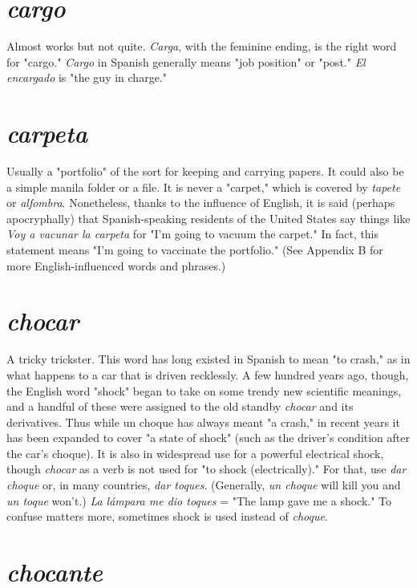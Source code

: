 \documentclass[14pt,a4paper,oneside]{memoir}
\begin{document}
\section{\emph{cargo}}

Almost works but not quite. \emph{Carga}, with the feminine ending, is the right word for "cargo." \emph{Cargo} in Spanish generally
means "job position" or "post." \emph{El encargado} is "the guy in charge."

\section{\emph{carpeta}}

Usually a "portfolio" of the sort for keeping and
carrying papers. It could also be a simple manila folder or a file. It is
never a "carpet," which is covered by \emph{tapete} or \emph{alfombra}. Nonetheless,
thanks to the influence of English, it is said (perhaps apocryphally) that
Spanish-speaking residents of the United States say things like \emph{Voy a
vacunar la carpeta} for "I'm going to vacuum the carpet." In fact, this
statement means "I'm going to vaccinate the portfolio." (See Appendix
B for more English-influenced words and phrases.)

\section{\emph{chocar}}

A tricky trickster. This word has long existed in
Spanish to mean "to crash," as in what happens to a car that is driven
recklessly. A few hundred years ago, though, the English word "shock"
began to take on some trendy new scientific meanings, and a handful
of these were assigned to the old standby \emph{chocar} and its derivatives.
Thus while un choque has always meant "a crash," in recent years it
has been expanded to cover "a state of shock" (such as the driver's condition after the car's choque). It is also in widespread use for a powerful electrical shock, though \emph{chocar} as a verb is not used for "to shock
(electrically)." For that, use \emph{dar choque} or, in many countries, \emph{dar toques}. (Generally, \emph{un choque} will kill you and \emph{un toque} won't.) \emph{La lámpara me dio toques} = "The lamp gave me a shock." To confuse matters more, sometimes shock is used instead of \emph{choque}.

\section{\emph{chocante}}
\end{document}
